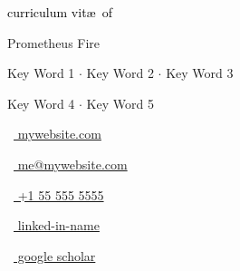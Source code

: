 \begin{scriptsize}
	 \textcolor{black}{curriculum vit\ae~of}
\end{scriptsize}

\vspace*{-0.10em}
\begin{Large} 
	Prometheus Fire
\end{Large}

\vspace*{0.25em}
\begin{scshape}
	\begin{footnotesize}
		  \textcolor{highlight2}{Key Word 1 $\cdot$ Key Word 2 $\cdot$ Key Word 3}
		  
		  \vspace*{-1ex}
		  \textcolor{highlight2}{Key Word 4 $\cdot$ Key Word 5}
	\end{footnotesize}
\end{scshape}
\vspace*{0.4cm}

\begin{footnotesize}
	\begin{tiny}\faHome\end{tiny}~\href{https://google.com}{
		mywebsite.com
	}
	\quad \begin{tiny}\faEnvelope[regular]\end{tiny}~\href{mailto:me@mywebsite.com}{%
		me@mywebsite.com
	} 
	
	\begin{tiny}\faMobile*\end{tiny}~\href{tel:001555555555}{
		+1 55 555 5555
	} 
	\quad 
	\begin{tiny}\faLinkedinIn\end{tiny}~\href{https://www.linkedin.com/in/MYLINK/}{
		linked-in-name
	}
	\quad 
	\begin{tiny}\faGraduationCap\end{tiny}~\href{https://scholar.google.com/citations?user=USERID&hl=en}{
		 google scholar
		}

\end{footnotesize}